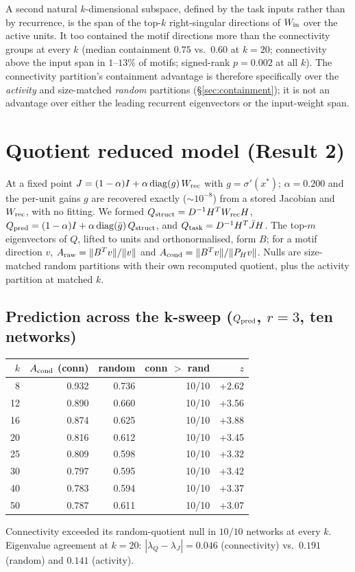 \documentclass[11pt]{article}
\begin{document}
A second natural $k$-dimensional subspace, defined by the task inputs rather than by recurrence,
is the span of the top-$k$ right-singular directions of $W_{\rm in}$ over the active units. It
too contained the motif directions more than the connectivity groups at every $k$ (median
containment $0.75$ vs.\ $0.60$ at $k=20$; connectivity above the input span in $1$--$13\%$ of
motifs; signed-rank $p=0.002$ at all $k$). The connectivity partition's containment advantage is
therefore specifically over the \emph{activity} and size-matched \emph{random} partitions
(\S\ref{sec:containment}); it is not an advantage over either the leading recurrent eigenvectors
or the input-weight span.

\section{Quotient reduced model (Result 2)}
\label{sec:quotient}
At a fixed point $J=(1-\alpha)I+\alpha\,\mathrm{diag}(g)\,W_{\rm rec}$ with $g=\sigma'(x^{*})$;
$\alpha=0.200$ and the per-unit gains $g$ are recovered exactly ($\sim10^{-8}$) from a stored
Jacobian and $W_{\rm rec}$, with no fitting. We formed $Q_{\rm struct}=D^{-1}H^{T}W_{\rm rec}H$,
$Q_{\rm pred}=(1-\alpha)I+\alpha\,\mathrm{diag}(\bar g)\,Q_{\rm struct}$, and $Q_{\rm task}=
D^{-1}H^{T}\bar J H$. The top-$m$ eigenvectors of $Q$, lifted to units and orthonormalised, form
$B$; for a motif direction $v$, $A_{\rm raw}=\lVert B^{T}v\rVert/\lVert v\rVert$ and
$A_{\rm cond}=\lVert B^{T}v\rVert/\lVert P_{H}v\rVert$. Nulls are size-matched random partitions
with their own recomputed quotient, plus the activity partition at matched $k$.

\subsection{Prediction across the k-sweep ($Q_{\rm pred}$, $r=3$, ten networks)}
\begin{center}\small
\begin{tabular}{rrrrr}
\toprule
$k$ & $A_{\rm cond}$ (conn) & random & conn $>$ rand & $z$ \\
\midrule
8  & 0.932 & 0.736 & 10/10 & +2.62 \\
12 & 0.890 & 0.660 & 10/10 & +3.56 \\
16 & 0.874 & 0.625 & 10/10 & +3.88 \\
20 & 0.816 & 0.612 & 10/10 & +3.45 \\
25 & 0.809 & 0.598 & 10/10 & +3.32 \\
30 & 0.797 & 0.595 & 10/10 & +3.42 \\
40 & 0.783 & 0.594 & 10/10 & +3.37 \\
50 & 0.787 & 0.611 & 10/10 & +3.07 \\
\bottomrule
\end{tabular}
\end{center}
Connectivity exceeded its random-quotient null in $10/10$ networks at every $k$. Eigenvalue
agreement at $k=20$: $|\lambda_{Q}-\lambda_{J}|=0.046$ (connectivity) vs.\ $0.191$ (random) and
$0.141$ (activity).
\end{document}
